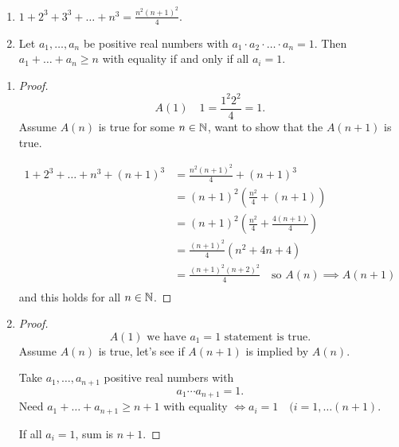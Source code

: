 \documentclass[10pt, a4paper]{article}
\begin{document}
\begin{example}
    \begin{enumerate}[label = (\alph*)]
        \item $1 + 2 ^ 3 + 3 ^ 3 + \dotsc + n ^ 3 = \frac{n ^ 2 (n + 1) ^ 2}{4}$.
        \item Let $a_1, \dotsc, a_n$ be positive real numbers with $a_1 \cdot a_2 \cdot \dotsc \cdot a_n = 1$. Then $a_1 + \dotsc + a_n \geq n$ with equality if and only if all $a_i = 1$.
    \end{enumerate}
    
    \begin{enumerate}[label = (\alph*)]
    \item
    \begin{proof}
        \[
        A(1)\quad 1 = \frac{1 ^ 2 2 ^ 2}{4} = 1.
        \]
        Assume $A(n)$ is true for some $n \in \mathbb{N}$, want to show that the $A(n + 1)$ is true.

        \begin{align*}
            1 + 2 ^ 3 + \dotsc + n ^ 3 + (n + 1) ^ 3 &= \frac{n ^ 2 (n + 1) ^ 2}{4} + (n + 1) ^ 3 \\
            &= (n + 1) ^ 2 \left(\frac{n ^ 2}{4} + (n + 1)\right) \\
            &= (n + 1) ^ 2 \left(\frac{n ^ 2}{4} + \frac{4(n + 1)}{4}\right) \\
            &= \frac{(n + 1) ^ 2}{4} \left(n ^ 2 + 4n + 4\right) \\
            &= \frac{(n + 1) ^ 2 (n + 2) ^ 2}{4}\quad\text{so } A(n) \implies A(n + 1) \\
        \end{align*}
        and this holds for all $n \in \mathbb{N}$.
    \end{proof}
    \item
    \begin{proof}
        \[
        A(1)\text{ we have } a_1 = 1\text{ statement is true}.
        \]
        Assume $A(n)$ is true, let's see if $A(n + 1)$ is implied by $A(n)$.

        Take $a_1, \dotsc, a_{n + 1}$ positive real numbers with
        \[
        a_1 \dotsi a_{n + 1} = 1.
        \]
        Need $a_1 + \dotsc + a_{n + 1} \geq n + 1$ with equality $\iff a_i = 1\quad(i = 1, \dotsc (n + 1)$.

        If all $a_i = 1$, sum is $n + 1$.


\end{proof}
\end{enumerate}
\end{example}
\end{document}
